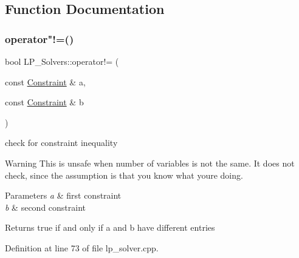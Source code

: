 \subsection{Function Documentation}
\mbox{\label{namespace_l_p___solvers_a49c6d0c3337c5bc3379a273ec332ba5c}} 
\subsubsection{\texorpdfstring{operator"!=()}{operator!=()}\hspace{0.1cm}{\footnotesize\ttfamily [1/2]}}
{\footnotesize\ttfamily bool L\+P\+\_\+\+Solvers\+::operator!= (\begin{DoxyParamCaption}\item[{const \hyperlink{group___c_l_s_solvers_class_l_p___solvers_1_1_constraint}{Constraint} \&}]{a,  }\item[{const \hyperlink{group___c_l_s_solvers_class_l_p___solvers_1_1_constraint}{Constraint} \&}]{b }\end{DoxyParamCaption})}



check for constraint inequality 

\begin{DoxyWarning}{Warning}
This is unsafe when number of variables is not the same. It does not check, since the assumption is that you know what you\textquotesingle{}re doing. 
\end{DoxyWarning}

\begin{DoxyParams}{Parameters}
{\em a} & first constraint \\
\hline
{\em b} & second constraint \\
\hline
\end{DoxyParams}
\begin{DoxyReturn}{Returns}
{\ttfamily true} if and only if {\ttfamily a} and {\ttfamily b} have different entries 
\end{DoxyReturn}


Definition at line 73 of file lp\+\_\+solver.\+cpp.

\mbox{\label{namespace_l_p___solvers_a20a1994c15aacbfd4215abf13fdf1e6d}} 
